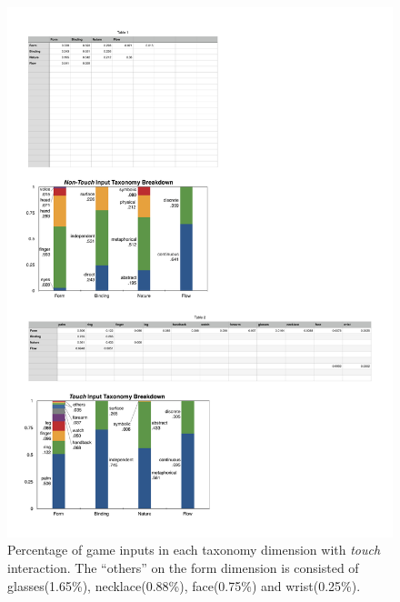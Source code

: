 \documentclass{sigchi}
\begin{document}
 \begin{figure}[!h]
  \centering
  \includegraphics[width=1\columnwidth]{OnbodyTaxonomy.pdf}
  \caption{Percentage of game inputs in each taxonomy dimension with \emph{touch} interaction. The  ``others'' on the form dimension is consisted of glasses(1.65\%), necklace(0.88\%), face(0.75\%) and wrist(0.25\%).}
  \label{fig:OnbodyTaxonomy}
  \end{figure} 
\end{document}
